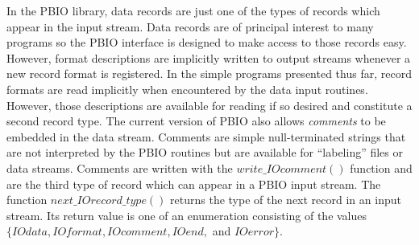 \documentclass{article}
\begin{document}
In the PBIO library, data records are just one of the types of records which
appear in the input stream.  Data records are of principal interest to many
programs so the PBIO interface is designed to make access to those records
easy.  However, format descriptions are implicitly written to output streams
whenever a new record format is registered.  In the simple programs presented
thus far, record formats are read implicitly when encountered by the data
input routines.  However, those descriptions are available for reading if so
desired and constitute a second record type.  The current version of PBIO also
allows {\it comments} to be embedded in the data stream.  Comments are simple
null-terminated strings that are not interpreted by the PBIO routines but are
available for ``labeling'' files or data streams.  Comments are written with
the $write\_IOcomment()$ function and are the third  type of record which can
appear in  a PBIO input stream.  The function $next\_IOrecord\_type()$ returns
the type of the next record in an input stream.  Its return value is one of an
enumeration consisting of the values $\{IOdata, IOformat, IOcomment, IOend,$
and $IOerror\}$.  
\end{document}

